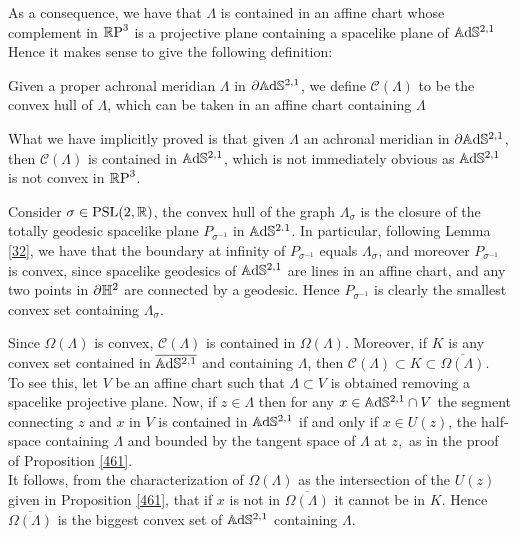 As a consequence, we have that $\Lambda$ is contained in an affine chart whose complement in $\mathbb{R}\text{P}^3$ is a projective plane containing a spacelike plane of $\mathbb{A}\mathrm{d}\mathbb{S}^{2,1}$ Hence it makes sense to give the following definition:

\begin{definition}
    Given a proper achronal meridian $\Lambda$ in $\partial\mathbb{A}\mathrm{d}\mathbb{S}^{2,1}$, we define $\mathcal{C}(\Lambda)$ to be the convex hull of $\Lambda$, which can be taken in an affine chart containing $\Lambda$
\end{definition}

What we have implicitly proved is that given $\Lambda$ an achronal meridian in $\partial\mathbb{A}\mathrm{d}\mathbb{S}^{2,1}$, then $\mathcal{C}(\Lambda)$ is contained in $\mathbb{A}\mathrm{d}\mathbb{S}^{2,1}$, which is not immediately obvious as $\mathbb{A}\mathrm{d}\mathbb{S}^{2,1}$ is not convex in $\mathbb{R}\text{P}^3$.

\begin{example}\label{43}
    Consider $\sigma\in\text{PSL}(2,\mathbb{R})$, the convex hull of the graph $\Lambda_\sigma$ is the closure of the totally geodesic spacelike plane $P_{\sigma^{-1}}$ in $\mathbb{A}\mathrm{d}\mathbb{S}^{2.1}$. In particular, following Lemma \ref{32}, we have that the boundary at infinity of $P_{\sigma^{-1}}$ equals $\Lambda_\sigma$, and moreover $P_{\sigma^{-1}}$ is convex, since spacelike geodesics of $\mathbb{A}\mathrm{d}\mathbb{S}^{2,1}$ are lines in an affine chart, and any two points in $\partial\mathbb{H}^2$ are connected by a geodesic. Hence $P_{\sigma^{-1}}$ is clearly the smallest convex set containing $\Lambda_\sigma$.  
\end{example}

\begin{observation}\label{436} Since $\Omega(\Lambda)$ is convex, $\mathcal{C}(\Lambda)$ is contained in $\Omega(\Lambda)$. Moreover, if $K$ is any convex set contained in $\overline{\mathbb{A}\mathrm{d}\mathbb{S}^{2,1}}$ and containing $\Lambda$, then $\mathcal{C}(\Lambda)\subset K\subset \overline{\Omega(\Lambda)}.$\\
    To see this, let $V$ be an affine chart such that $\Lambda\subset V$ is obtained removing a spacelike projective plane. Now, if $z\in \Lambda$ then for any $x\in\mathbb{A}\mathrm{d}\mathbb{S}^{2,1}\cap V$ the segment connecting $z$ and $x$ in $V$ is contained in $\mathbb{A}\mathrm{d}\mathbb{S}^{2,1}$ if and only if $x\in U(z)$, the half-space containing $\Lambda$ and bounded by the tangent space of $\Lambda$ at $z,$ as in the proof of Proposition \ref{461}. \\
    It follows, from the characterization of $\Omega(\Lambda)$ as the intersection of the $U(z)$ given in Proposition \ref{461}, that if $x$ is not in $\overline{\Omega(\Lambda)}$ it cannot be in $K$. Hence $\overline{\Omega(\Lambda)}$ is the biggest convex set of $\mathbb{A}\mathrm{d}\mathbb{S}^{2,1}$ containing $\Lambda$.
\end{observation}

